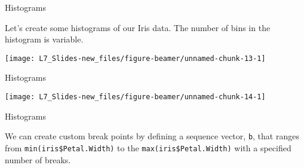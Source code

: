 \documentclass[ignorenonframetext,]{beamer}
\newenvironment{Shaded}{\begin{snugshade}}{\end{snugshade}}
\newcommand{\KeywordTok}[1]{\textcolor{white}{\textbf{{#1}}}}
\newcommand{\NormalTok}[1]{\textcolor{yellow}{{#1}}}
\newcommand{\DataTypeTok}[1]{\textcolor{yellow}{{#1}}}
\newcommand{\DecValTok}[1]{\textcolor{numbercolor}{{#1}}}
\newcommand{\StringTok}[1]{\textcolor{yellow}{{#1}}}
\begin{document}
\begin{frame}[fragile]{Histograms}

Let's create some histograms of our Iris data. The number of bins in the
histogram is variable.

\small

\begin{Shaded}
\end{Shaded}

\begin{center}\texttt{[image: L7\_Slides-new\_files/figure-beamer/unnamed-chunk-13-1]} \end{center}

\end{frame}

\begin{frame}[fragile]{Histograms}

\small

\begin{Shaded}
\end{Shaded}

\begin{center}\texttt{[image: L7\_Slides-new\_files/figure-beamer/unnamed-chunk-14-1]} \end{center}

\end{frame}

\begin{frame}[fragile]{Histograms}

We can create custom break points by defining a sequence vector,
\texttt{b}, that ranges from \texttt{min(iris\$Petal.Width)} to the
\texttt{max(iris\$Petal.Width)} with a specified number of breaks.

\small

\begin{Shaded}
\end{Shaded}

\end{frame}
\end{document}
